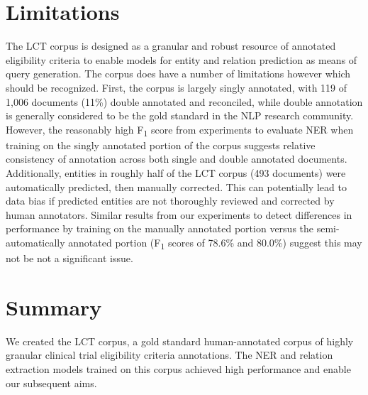 \documentclass[../main.tex]{subfiles}
\begin{document}
\section{Limitations}
The LCT corpus is designed as a granular and robust resource of annotated eligibility criteria to enable models for entity and relation prediction as means of query generation. The corpus does have a number of limitations however which should be recognized. First, the corpus is largely singly annotated, with 119 of 1,006 documents (11\%) double annotated and reconciled, while double annotation is generally considered to be the gold standard in the NLP research community. However, the reasonably high F\textsubscript{1} score from experiments to evaluate NER when training on the singly annotated portion of the corpus suggests relative consistency of annotation across both single and double annotated documents. Additionally, entities in roughly half of the LCT corpus (493 documents) were automatically predicted, then manually corrected. This can potentially lead to data bias if predicted entities are not thoroughly reviewed and corrected by human annotators. Similar results from our experiments to detect differences in performance by training on the manually annotated portion versus the semi-automatically annotated portion (F\textsubscript{1} scores of 78.6\% and 80.0\%) suggest this may not be not a significant issue.

\section{Summary}
We created the LCT corpus, a gold standard human-annotated corpus of highly granular clinical trial eligibility criteria annotations. The NER and relation extraction models trained on this corpus achieved high performance and enable our subsequent aims.
\end{document}

